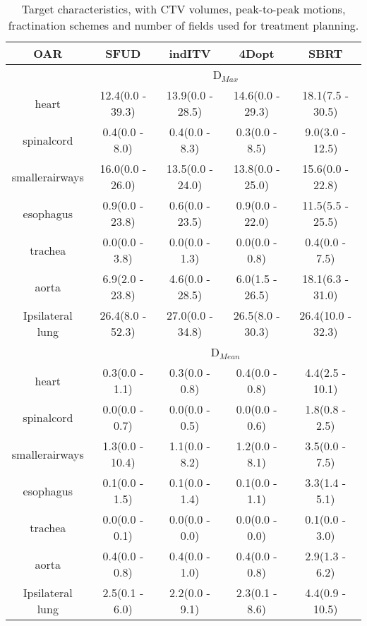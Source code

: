 \begin{table}[H]
	\centering
	\caption{Target characteristics, with CTV volumes, peak-to-peak motions, fractination schemes and number of fields used for treatment planning.}
	\begin{tabular}{c|c|c|c|c}
		\hline\hline
		 
		OAR & SFUD & indITV & 4Dopt & SBRT \\
		\hline
		& \multicolumn{4}{c}{D$_{Max}$} \\
		\hline
heart & 12.4(0.0 - 39.3) & 13.9(0.0 - 28.5) & 14.6(0.0 - 29.3) & 18.1(7.5 - 30.5)\\ 
spinalcord & 0.4(0.0 - 8.0) & 0.4(0.0 - 8.3) & 0.3(0.0 - 8.5) & 9.0(3.0 - 12.5)\\ 
smallerairways & 16.0(0.0 - 26.0) & 13.5(0.0 - 24.0) & 13.8(0.0 - 25.0) & 15.6(0.0 - 22.8)\\ 
esophagus & 0.9(0.0 - 23.8) & 0.6(0.0 - 23.5) & 0.9(0.0 - 22.0) & 11.5(5.5 - 25.5)\\ 
trachea & 0.0(0.0 - 3.8) & 0.0(0.0 - 1.3) & 0.0(0.0 - 0.8) & 0.4(0.0 - 7.5)\\ 
aorta & 6.9(2.0 - 23.8) & 4.6(0.0 - 28.5) & 6.0(1.5 - 26.5) & 18.1(6.3 - 31.0)\\ 
Ipsilateral lung & 26.4(8.0 - 52.3) & 27.0(0.0 - 34.8) & 26.5(8.0 - 30.3) & 26.4(10.0 - 32.3)\\ 

\hline\hline
& \multicolumn{4}{c}{D$_{Mean}$} \\

heart & 0.3(0.0 - 1.1) & 0.3(0.0 - 0.8) & 0.4(0.0 - 0.8) & 4.4(2.5 - 10.1)\\ 
spinalcord & 0.0(0.0 - 0.7) & 0.0(0.0 - 0.5) & 0.0(0.0 - 0.6) & 1.8(0.8 - 2.5)\\ 
smallerairways & 1.3(0.0 - 10.4) & 1.1(0.0 - 8.2) & 1.2(0.0 - 8.1) & 3.5(0.0 - 7.5)\\ 
esophagus & 0.1(0.0 - 1.5) & 0.1(0.0 - 1.4) & 0.1(0.0 - 1.1) & 3.3(1.4 - 5.1)\\ 
trachea & 0.0(0.0 - 0.1) & 0.0(0.0 - 0.0) & 0.0(0.0 - 0.0) & 0.1(0.0 - 3.0)\\ 
aorta & 0.4(0.0 - 0.8) & 0.4(0.0 - 1.0) & 0.4(0.0 - 0.8) & 2.9(1.3 - 6.2)\\ 
Ipsilateral lung & 2.5(0.1 - 6.0) & 2.2(0.0 - 9.1) & 2.3(0.1 - 8.6) & 4.4(0.9 - 10.5)\\ 


\hline\hline

	\end{tabular}
	\label{tab:OARComplex}
\end{table}
